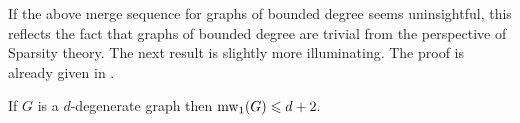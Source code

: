 If the above merge sequence for graphs of bounded degree seems uninsightful,
this reflects the fact that graphs of bounded degree are trivial from the perspective of Sparsity theory.
The next result is slightly more 
illuminating.
The proof is already given in .




\begin{theorem}\label{thm:deg}
  If $G$ is a $d$-degenerate graph then 
  $\operatorname{mw}_1(G)\leqslant d+2.$
\end{theorem}

%

